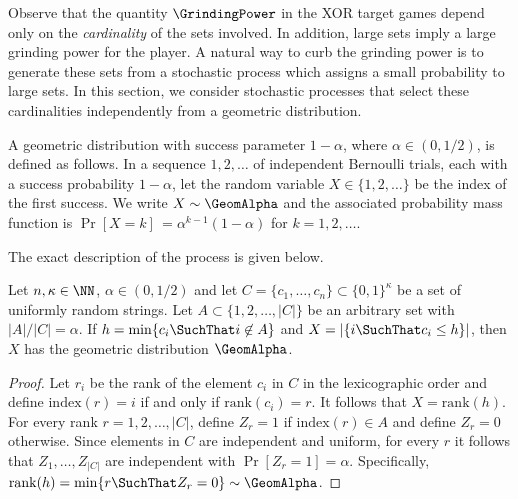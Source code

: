 

\newcommand{\Paragraph}[1]{\\ \\ \noindent\textbf{{#1}}\ }

Observe that the quantity $\GrindingPower$ in the XOR target games depend only on the 
\emph{cardinality} of the sets involved. 
In addition, large sets imply a large grinding power for the player. 
A natural way to curb the grinding power is to generate these sets from a stochastic 
process which assigns a small probability to large sets. 
In this section, we consider stochastic processes that select these cardinalities independently 
from a geometric distribution. 

A geometric distribution with 
success parameter $1-\alpha$, where $\alpha \in (0, 1/2)$, is defined as follows.
In a sequence $1, 2, \ldots$ of independent Bernoulli trials, 
each with a success probability $1 - \alpha$, 
let the random variable $X \in \{1, 2, \ldots\}$ be the index of the first success.
We write $X \sim \GeomAlpha$ and the associated probability mass function is
$\Pr[X = k]\, = \alpha^{k-1}(1-\alpha)$ for $k = 1, 2, \ldots$. 


The exact description of the process is given below.

\begin{claim}\label{claim:set-size-geometric}
Let $n, \kappa \in \NN$, $\alpha \in (0, 1/2)$ and 
let $C = \{c_1, \ldots, c_n\} \subset \{0,1\}^\kappa$ be a set of uniformly random strings. 
Let $A \subset \{1, 2, \ldots, |C|\}$ be an arbitrary set with $|A|/|C| = \alpha$. 
If $h = \min \{c_i \SuchThat i \not \in A\}$ and 
$X = |\{i \SuchThat c_i \leq h\}|$, 
then $X$ has the geometric distribution $\GeomAlpha$.
\end{claim}
\begin{proof}
\newcommand{\Rank}{\mathrm{rank}}
\newcommand{\Index}{\mathrm{index}}
Let $r_i$ be the rank of the element $c_i$ in $C$ in the lexicographic order and 
define $\Index(r) = i$ if and only if $\Rank(c_i) = r$.
It follows that $X = \Rank(h)$.
For every rank $r = 1, 2, \ldots, |C|$, define $Z_r = 1$ if $\Index(r) \in A$ and 
define $Z_r = 0$ otherwise.
Since elements in $C$ are independent and uniform, for every $r$ it follows that 
$Z_1, \ldots, Z_{|C|}$ are independent with $\Pr[Z_r = 1] = \alpha$. 
Specifically, $\Rank(h) = \min \{r \SuchThat Z_r = 0\} \sim \GeomAlpha$.
\end{proof}


